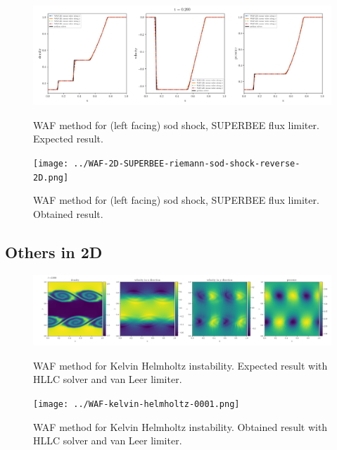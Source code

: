     \begin{figure}[htbp]
        \centering
        \includegraphics[width=.9\textwidth]{./figures/WAF-2D-SUPERBEE-riemann-sod-shock-reverse-2D.png}%
        \caption{WAF method for (left facing) sod shock, SUPERBEE flux limiter. Expected result.}
        \texttt{[image: ../WAF-2D-SUPERBEE-riemann-sod-shock-reverse-2D.png]}%
        \caption{WAF method for (left facing) sod shock, SUPERBEE flux limiter. Obtained result.}
    \end{figure}







\clearpage
\subsection{Others in 2D}

    \begin{figure}[htbp]
        \centering
        \includegraphics[width=.9\textwidth]{./figures/WAF-kelvin-helmholtz-0001.png}%
        \caption{WAF method for Kelvin Helmholtz instability. Expected result with HLLC solver and van Leer limiter.}
        \texttt{[image: ../WAF-kelvin-helmholtz-0001.png]}%
        \caption{WAF method for Kelvin Helmholtz instability. Obtained result with HLLC solver and van Leer limiter.}
    \end{figure}






